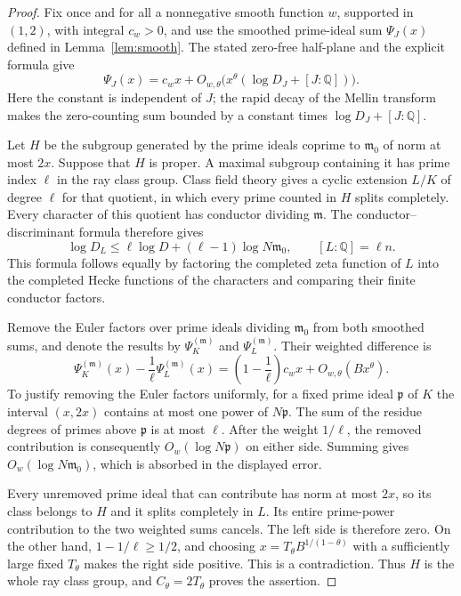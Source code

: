 \documentclass[11pt]{article}
\theoremstyle{definition}
\theoremstyle{remark}
\begin{document}
\begin{proof}
Fix once and for all a nonnegative smooth function $w$, supported
in $(1,2)$, with integral $c_w>0$, and use the smoothed prime-ideal
sum $\Psi_J(x)$ defined in Lemma~\ref{lem:smooth}.
The stated zero-free half-plane and the explicit formula give
\[
 \Psi_J(x)=c_wx+
 O_{w,\theta}\bigl(x^\theta(\log D_J+[J:\mathbb Q])\bigr).
\]
Here the constant is independent of $J$; the rapid decay of the
Mellin transform makes the zero-counting sum bounded by a constant
times $\log D_J+[J:\mathbb Q]$.

Let $H$ be the subgroup generated by the prime ideals coprime to
$\mathfrak m_0$ of norm at most $2x$.
Suppose that $H$ is proper.  A maximal subgroup containing it
has prime index $\ell$ in the ray class group.
Class field theory gives a cyclic extension $L/K$ of degree $\ell$
for that quotient, in which every prime counted in $H$ splits
completely.  Every character of this quotient has conductor dividing
$\mathfrak m$.  The conductor--discriminant formula therefore gives
\[
 \log D_L\le\ell\log D+(\ell-1)\log N\mathfrak m_0,
 \qquad [L:\mathbb Q]=\ell n.
\]
This formula follows equally by factoring the completed zeta function
of $L$ into the completed Hecke functions of the characters and
comparing their finite conductor factors.

Remove the Euler factors over prime ideals dividing
$\mathfrak m_0$ from both smoothed sums, and denote the results
by $\Psi_K^{(\mathfrak m)}$ and $\Psi_L^{(\mathfrak m)}$.
Their weighted difference is
\[
 \Psi_K^{(\mathfrak m)}(x)
       -\frac1\ell\Psi_L^{(\mathfrak m)}(x)
 =\left(1-\frac1\ell\right)c_wx+O_{w,\theta}(Bx^\theta).
\]
To justify removing the Euler factors uniformly, for a fixed
prime ideal $\mathfrak p$ of $K$ the interval $(x,2x)$ contains
at most one power of $N\mathfrak p$.
The sum of the residue degrees of primes above $\mathfrak p$
is at most $\ell$.  After the weight $1/\ell$, the removed
contribution is consequently $O_w(\log N\mathfrak p)$ on
either side.  Summing gives $O_w(\log N\mathfrak m_0)$,
which is absorbed in the displayed error.

Every unremoved prime ideal that can contribute has norm at most
$2x$, so its class belongs to $H$ and it splits completely in $L$.
Its entire prime-power contribution to the two weighted sums
cancels.  The left side is therefore zero.
On the other hand, $1-1/\ell\ge1/2$, and choosing
$x=T_\theta B^{1/(1-\theta)}$ with a sufficiently large fixed
$T_\theta$ makes the right side positive.  This is a contradiction.
Thus $H$ is the whole ray class group, and
$C_\theta=2T_\theta$ proves the assertion.
\end{proof}
\end{document}
